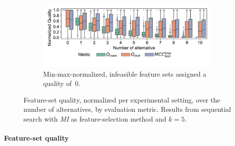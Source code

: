 \documentclass{article}
\theoremstyle{definition}
\begin{document}
\begin{figure}[p]
\begin{subfigure}[t]{\textwidth}
		\label{fig:afs:impact-num-alternatives-quality-min-max}
	\end{subfigure}
	\begin{subfigure}[t]{\textwidth}
		\centering
		\includegraphics[width=\textwidth, trim=15 30 15 15, clip]{plots/afs-impact-num-alternatives-quality-min-max-fillna.pdf}
		\caption{Min-max-normalized, infeasible feature sets assigned a quality of~0.}
		\label{fig:afs:impact-num-alternatives-quality-min-max-fillna}
	\end{subfigure}
	\caption{
		Feature-set quality, normalized per experimental setting, over the number of alternatives, by evaluation metric.
		Results from sequential search with \emph{MI} as feature-selection method and $k=5$.
	}
	\label{fig:afs:impact-num-alternatives-quality}
\end{figure}

\paragraph{Feature-set quality}
\end{document}
